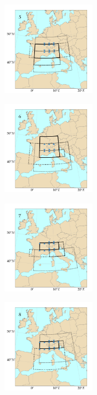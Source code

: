 \documentclass[twocol]{ametsoc}
\begin{document}
\begin{figure}[htb]
\begin{subfigure}{.5\columnwidth}
	\end{subfigure}
	\begin{subfigure}{.5\columnwidth}
		\centering
		\includegraphics[width=4cm]{figures/spatial_win_z4-hi2/Spatial_windows_5.png}
	\end{subfigure}%
	\begin{subfigure}{.5\columnwidth}
		\centering
		\includegraphics[width=4cm]{figures/spatial_win_z4-hi2/Spatial_windows_6.png}
	\end{subfigure}
	\begin{subfigure}{.5\columnwidth}
		\centering
		\includegraphics[width=4cm]{figures/spatial_win_z4-hi2/Spatial_windows_7.png}
	\end{subfigure}%
	\begin{subfigure}{.5\columnwidth}
		\centering
		\includegraphics[width=4cm]{figures/spatial_win_z4-hi2/Spatial_windows_8.png}
	\end{subfigure}

\end{figure}
\end{document}
